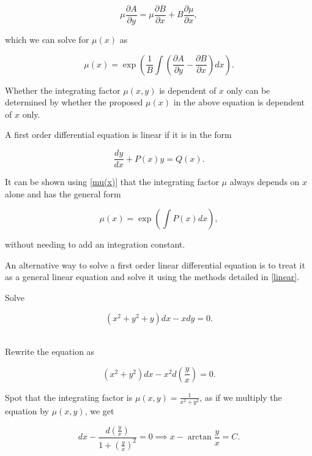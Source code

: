 \documentclass[english,a4paper,12pt]{report}
\begin{document}
\begin{equation}
    \mu \frac{\partial A}{\partial y} = \mu \frac{\partial B}{\partial x} + B \frac{\partial \mu}{\partial x},
\end{equation}

which we can solve for \(\mu (x)\) as

\begin{equation} \label{mu(x)} 
    \mu (x) = \exp \left( \frac{1}{B} \int \left(\frac{\partial A}{\partial y} -\frac{\partial B}{\partial x} \right)dx  \right).
\end{equation}

Whether the integrating factor \(\mu (x,y)\) is dependent of \(x\) only can be determined by whether the proposed \(\mu (x)\) in the above equation is dependent of \(x\) only.  

A first order differential equation is linear if it is in the form

\begin{equation}
    \frac{dy}{dx} + P(x)y = Q(x). 
\end{equation}

It can be shown using \cref{mu(x)} that the integrating factor \(\mu \) always depends on \(x\) alone and has the general form

\begin{equation}
    \mu (x) = \exp \left( \int P(x) dx \right),
\end{equation}

without needing to add an integration constant.

An alternative way to solve a first order linear differential equation is to treat it as a general linear equation and solve it using the methods detailed in \cref{linear}. 

{Solve

\begin{equation}
    (x^2+y^2+y)dx - xdy=  0.
\end{equation}~
}
{Rewrite the equation as

\begin{equation}
    (x^2+y^2)dx-x^2d\left( \frac{y}{x}  \right) = 0.
\end{equation}

Spot that the integrating factor is \(\displaystyle \mu (x,y) = \frac{1}{x^2+y^2} \), as if we multiply the equation by \(\mu (x,y)\), we get

\begin{equation}
    dx - \frac{d\left( \frac{y}{x}  \right)}{1+(\frac{y}{x} )^2} = 0 \implies x - \arctan {\frac{y}{x} }=C.  
\end{equation}~
} 
\end{document}
